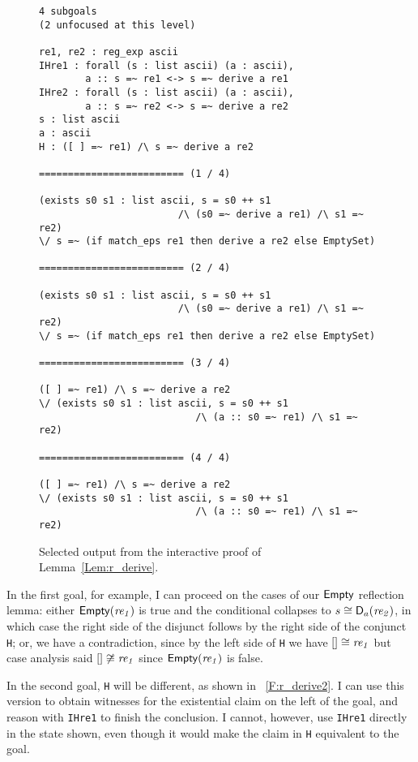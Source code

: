 \begin{figure}
\begin{verbatim}
4 subgoals
(2 unfocused at this level)

re1, re2 : reg_exp ascii
IHre1 : forall (s : list ascii) (a : ascii),
        a :: s =~ re1 <-> s =~ derive a re1
IHre2 : forall (s : list ascii) (a : ascii),
        a :: s =~ re2 <-> s =~ derive a re2
s : list ascii
a : ascii
H : ([ ] =~ re1) /\ s =~ derive a re2

========================= (1 / 4)

(exists s0 s1 : list ascii, s = s0 ++ s1
                        /\ (s0 =~ derive a re1) /\ s1 =~ re2)
\/ s =~ (if match_eps re1 then derive a re2 else EmptySet)

========================= (2 / 4)

(exists s0 s1 : list ascii, s = s0 ++ s1
                        /\ (s0 =~ derive a re1) /\ s1 =~ re2)
\/ s =~ (if match_eps re1 then derive a re2 else EmptySet)

========================= (3 / 4)

([ ] =~ re1) /\ s =~ derive a re2
\/ (exists s0 s1 : list ascii, s = s0 ++ s1
                           /\ (a :: s0 =~ re1) /\ s1 =~ re2)

========================= (4 / 4)

([ ] =~ re1) /\ s =~ derive a re2
\/ (exists s0 s1 : list ascii, s = s0 ++ s1
                           /\ (a :: s0 =~ re1) /\ s1 =~ re2)
\end{verbatim}
    \caption{Selected output from the interactive proof of
    Lemma~\ref{Lem:r_derive}.}\label{F:r_derive}
\end{figure}

In the first goal, for example, I can proceed on the cases of our
\(\mathsf{Empty}\) reflection lemma: either \(\mathsf{Empty}(\mathit{re_1})\) is true
and the conditional collapses to \(s \mathrel{\cong} \mathsf{D}_a(\mathit{re_2})\), in which
case the right side of the disjunct follows by the right side of the conjunct
\texttt{H}; or, we have a contradiction, since by the left side of \texttt{H} we have \([]
\mathrel{\cong} \mathit{re_1}\) but case analysis said \([] \not\mathrel{\cong} \mathit{re_1}\)
since \(\mathsf{Empty}(\mathit{re_1})\) is false.

In the second goal, \texttt{H} will be different, as shown in
\figurename~\ref{F:r_derive2}. I can use this version to obtain witnesses for
the existential claim on the left of the goal, and reason with \texttt{IHre1} to
finish the conclusion. I cannot, however, use \texttt{IHre1} directly in the
state shown, even though it would make the claim in \texttt{H} equivalent to the
goal.


